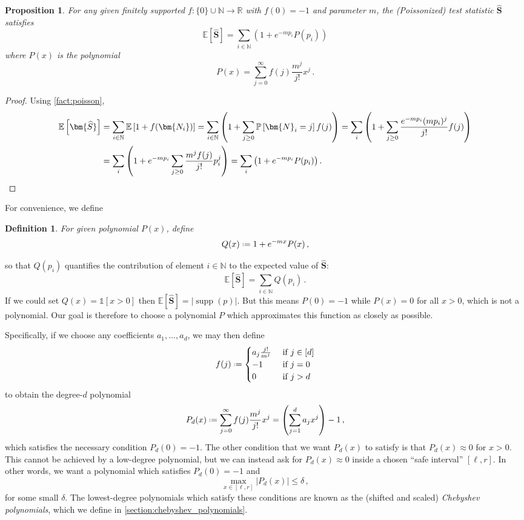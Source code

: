 \documentclass[10pt,a4paper]{article}
\newtheorem{proposition}{Proposition}[section]
\newtheorem{definition}{Definition}[section]
\DeclareMathOperator{\supp}{supp}   %
\newcommand{\Ex}[1]{\bE \left[ #1 \right]}
\renewcommand{\Pr}[1]{\bP \left[ #1 \right]} %
\newcommand*{\define}{\mathrel{\vcenter{\baselineskip0.5ex \lineskiplimit0pt
                      \hbox{\scriptsize.}\hbox{\scriptsize.}}}%
                      =}
\newcommand{\ind}[1]{\mathds{1} \left[ #1 \right] }
\newcommand{\bE}{\ensuremath{\mathbb{E}}}
\newcommand{\bN}{\ensuremath{\mathbb{N}}}
\newcommand{\bP}{\ensuremath{\mathbb{P}}}
\newcommand{\bR}{\ensuremath{\mathbb{R}}}
\begin{document}
\begin{proposition}
For any given finitely supported $f \colon \{0\} \cup \bN \to \bR$ with $f(0) = -1$ and parameter
$m$, the (Poissonized) test statistic $\widehat{\bm S}$ satisfies
\begin{equation}
\label{eq:mean-P}
  \Ex{ \widehat{ \bm S } }
  = \sum_{i \in \bN} ( 1 + e^{-mp_i} P(p_i) )
\end{equation}
where $P(x)$ is the polynomial
\[
  P(x) = \sum_{j=0}^\infty f(j) \frac{m^j}{j!} x^j \,.
\]
\end{proposition}
\begin{proof}
Using \cref{fact:poisson},
\begin{align*}
        \Ex{\bm{\widehat S}}
        &= \sum_{i \in \bN} \Ex{1 + f(\bm{N_i}) }
         = \sum_{i \in \bN} \left( 1 + \sum_{j \ge 0} \Pr{\bm{N}_i = j} f(j) \right) 
        = \sum_{i} \left( 1 + \sum_{j \ge 0} \frac{e^{-mp_i}(mp_i)^j}{j!} f(j) \right) \\
        &= \sum_{i} \left(
            1 + e^{-mp_i} \sum_{j \ge 0} \frac{m^j f(j)}{j!} p_i^j \right)
        = \sum_{i} \left( 1 + e^{-mp_i} P(p_i) \right). \qedhere
\end{align*}
\end{proof}
For convenience, we define
\begin{definition}
\label{def:Q}
For given polynomial $P(x)$, define
\[
  Q(x) \define 1 + e^{-mx} P(x) \,,
\]
\end{definition}
\noindent
so that $Q(p_i)$ quantifies the contribution of element $i \in \bN$
to the expected value of $\bm{\widehat S}$:
\begin{equation}
\label{eq:mean-Q}
  \Ex{\bm{\widehat S}} = \sum_{i \in \bN} Q(p_i) \,.
\end{equation}
If we could set $Q(x) = \ind{x > 0}$ then $\Ex{\bm{\widehat S}} = |\supp(p)|$.  But this
means $P(0) = -1$ while $P(x) = 0$ for all $x > 0$, which is not a polynomial.
Our goal is therefore to choose a polynomial $P$ which approximates this function as closely as
possible.

Specifically, if we choose any coefficients $a_1, \dotsc, a_d$, we may then define
\[
    f(j) \define \begin{cases}
      a_j \frac{j!}{m^j} &\text{ if } j \in [d] \\
      -1 &\text{ if } j = 0 \\
      0 &\text{ if } j > d 
    \end{cases}
\]
to obtain the degree-$d$ polynomial
\[
  P_d(x) \define \sum_{j=0}^\infty f(j) \frac{m^j}{j!} x^j = \left(\sum_{j=1}^d a_j x^j\right) - 1
  \,,
\]
which satisfies the necessary condition $P_d(0) = -1$. The other condition that we want $P_d(x)$ to
satisfy is that $P_d(x) \approx 0$ for $x > 0$. This cannot be achieved by a low-degree polynomial,
but we can instead ask for $P_d(x) \approx 0$ inside a chosen ``safe interval'' $[\ell, r]$. In other words,
we want a polynomial which satisfies $P_d(0) = -1$ and
\[
  \max_{x \in [\ell, r]} |P_d(x)| \leq \delta \,,
\]
for some small $\delta$. The lowest-degree polynomials which satisfy these conditions are known
as the (shifted and scaled) \emph{Chebyshev polynomials}, which we define in
\cref{section:chebyshev_polynomials}.
\end{document}
